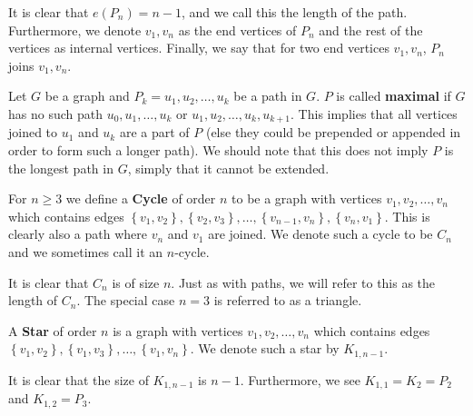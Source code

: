 \begin{definition}[Path]
	A \textbf{Path} of order $n$ is a graphs with vertices $v_1, v_2, \ldots, v_{n} \in V$ such that the edges $\left\{ v_1, v_2 \right\}, \left\{ v_2, v_3 \right\} ,\ldots , \left\{ v_{n-1}, v_{n} \right}  \in E$. We denote such a path by $P_{n}$.
\end{definition}
\begin{notation}
	It is clear that $e\left( P_{n} \right) = n-1 $, and we call this the length of the path.
	Furthermore, we denote $v_1, v_{n}$ as the end vertices of $P_{n}$ and the rest of the vertices as internal vertices. Finally, we say that for two end vertices $v_1, v_{n}$, $P_{n}$ joins $v_1, v_{n}$.
\end{notation}
\begin{definition}
	Let  $G$ be a graph and $P_{k} = u_1, u_2, \ldots, u_{k}$ be a path in $G$. $P$ is called \textbf{maximal} if $G$ has no such path $u_0, u_1, \ldots, u_{k}$ or $u_1, u_2, \ldots, u_{k}, u_{k+1}$. This implies that all vertices joined to $u_1$ and $u_{k}$ are a part of $P$ (else they could be prepended or appended in order to form such a longer path). We should note that this does not imply $P$ is the longest path in $G$, simply that it cannot be extended.
\end{definition}
\begin{definition}[Cycles]
	For $n\ge 3$ we define a  \textbf{Cycle} of order $n$ to be a graph with vertices $v_1, v_2, \ldots, v_{n}$ which contains edges $\left\{ v_1, v_2 \right\} , \left\{ v_2, v_3 \right\}, \ldots, \left\{ v_{n-1}, v_{n} \right\}, \left\{ v_{n}, v_1 \right\}  $. This is clearly also a path where $v_{n}$ and $v_1$ are joined. We denote such a cycle to be $C_{n}$ and we sometimes call it an $n$-cycle.
\end{definition}
\begin{remark}
	It is clear that $C_{n}$ is of size $n$. Just as with paths, we will refer to this as the length of $C_{n}$.
	The special case $ n=3$ is referred to as a triangle.
\end{remark}
\begin{definition}[Stars]
	A  \textbf{Star} of order  $n$ is a graph with vertices $v_1, v_2, \ldots, v_{n}$ which contains edges $\left\{ v_1, v_2 \right\} , \left\{ v_1, v_3 \right\} , \ldots, \left\{ v_1, v_{n} \right\} $. We denote such a star by $K_{1, n-1}$.
\end{definition}
\begin{remark}
	It is clear that the size of $K_{1, n-1}$ is $n-1$. Furthermore, we see $K_{1,1} = K_2 = P_2$ and $K_{1,2} = P_3$.
\end{remark}
